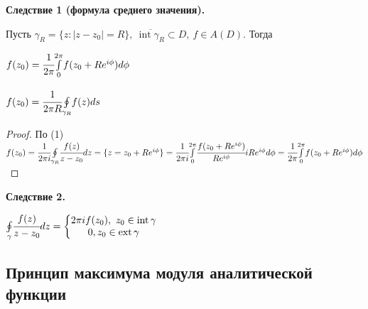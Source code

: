 \documentclass[final]{report}
\newcommand{\mint}[2]{\underset{#1}{\overset{#2}{\int}}}
\newcommand{\moint}[1]{\underset{#1}{\oint}}
\newcommand{\Int}{\mathop{\mathrm{int}}\nolimits}
\newcommand{\Ext}{\mathop{\mathrm{ext}}\nolimits}
\newcommand{\g}{\gamma}
\renewcommand{\f}{\phi}
\newcommand{\sys}[1]{\left\{\begin{matrix}#1\end{matrix}\right.}
\theoremstyle{remark}
\begin{document}
{\bfseries Следствие 1 (формула среднего значения).}

Пусть $\g_R=\{z\colon|z-z_0|=R\},\ \overline{\Int\g_R}\subset D,\ f\in A(D)$. Тогда 

$f(z_0)=\cfrac{1}{2\pi}\mint{0}{2\pi}f(z_0+Re^{i\f})d\f$

$f(z_0)=\cfrac{1}{2\pi R}\moint{\g_R}f(z)ds$
\begin{proof}
По (1) $f(z_0)=\cfrac{1}{2\pi i}\moint{\g_R}\cfrac{f(z)}{z-z_0}dz=\{z=z_0+Re^{i\f}\}=\cfrac{1}{2\pi i}\mint{0}{2\pi}\cfrac{f(z_0+Re^{i\f})}{Re^{i\f}}iRe^{i\f}d\f=\cfrac{1}{2\pi}\mint{0}{2\pi}f(z_0+Re^{i\f})d\f$
\end{proof}

{\bfseries Следствие 2.}

$\moint{\g}\cfrac{f(z)}{z-z_0}dz=\sys{2\pi if(z_0),\ z_0\in\Int \g \\ 0, z_0\in\Ext\g}$

\newpage

\subsection{Принцип максимума модуля аналитической функции}
\end{document}
